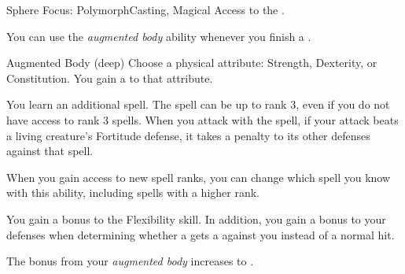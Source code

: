     \begin{magicalfeat}{Sphere Focus: Polymorph}{Casting, Magical}
        \featpre Access to the  .

         You can use the \textit{augmented body} ability whenever you finish a .
        \begin{magicalattuneability}{Augmented Body}{ (deep)}
            Choose a physical attribute: Strength, Dexterity, or Constitution.
            You gain a   to that attribute.
        \end{magicalattuneability}

         You learn an additional spell.
        The spell can be up to rank 3, even if you do not have access to rank 3 spells.
        When you attack with the spell, if your attack beats a living creature's Fortitude defense, it takes a  penalty to its other defenses against that spell.

        When you gain access to new spell ranks, you can change which spell you know with this ability, including spells with a higher rank.

         You gain a  bonus to the Flexibility skill.
        In addition, you gain a  bonus to your defenses when determining whether a  gets a  against you instead of a normal hit.

         The bonus from your \textit{augmented body} increases to .
    \end{magicalfeat}

